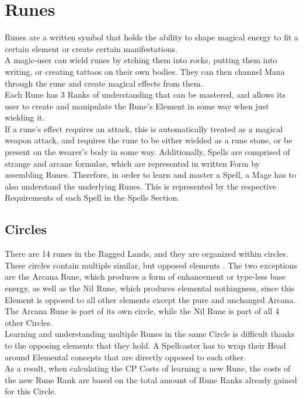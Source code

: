 \chapter*{Runes}\label{ch:runes}

Runes are a written symbol that holds the ability to shape magical energy to fit a certain element or create certain manifestations.\\
A magic-user can wield runes by etching them into rocks, putting them into writing, or creating tattoos on their own bodies.
They can then channel Mana through the rune and create magical effects from them.\\
Each Rune has 3 Ranks of understanding that can be mastered, and allows its user to create and manipulate the Rune's Element in some way when just wielding it.\\
If a rune's effect requires an attack, this is automatically treated as a magical weapon attack, and requires the rune to be either wielded as a rune stone, or be present on the wearer's body in some way.
Additionally, Spells are comprised of strange and arcane formulae, which are represented in written Form by assembling Runes.
Therefore, in order to learn and master a Spell, a Mage has to also understand the underlying Runes.
This is represented by the respective Requirements of each Spell in the Spells Section.

\section{Circles}\label{sec:arcaneCircles}
There are 14 runes in the Ragged Lands, and they are organized within circles.
These circles contain multiple similar, but opposed elements .
The two exceptions are the Arcana Rune, which produces a form of enhancement or type-less base energy, as well as the Nil Rune, which produces elemental nothingness, since this Element is opposed to all other elements except the pure and unchanged Arcana.
The Arcana Rune is part of its own circle, while the Nil Rune is part of all 4 other Circles.\\

Learning and understanding multiple Runes in the same Circle is difficult thanks to the opposing elements that they hold.
A Spellcaster has to wrap their Head around Elemental concepts that are directly opposed to each other.\\

As a result, when calculating the CP Costs of learning a new Rune, the costs of the new Rune Rank are based on the total amount of Rune Ranks already gained for this Circle.\\

